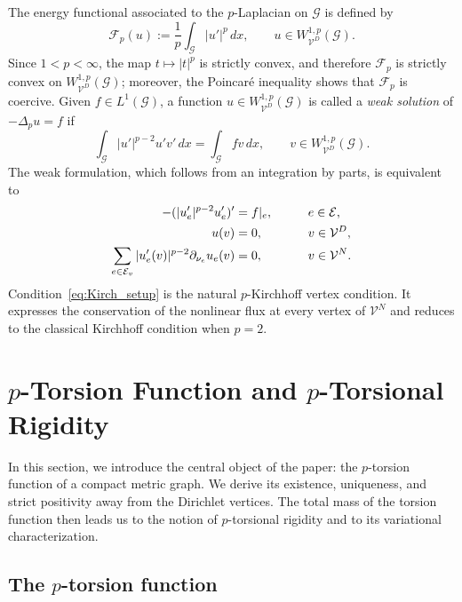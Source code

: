 \documentclass[12pt,a4paper]{article}
\numberwithin{equation}{section}
\newcommand{\WpD}{W^{1,p}_{\mathcal{V}^D}(\mathcal G)}
\begin{document}
The energy functional associated to the $p$-Laplacian on $\mathcal G$ is defined by
\begin{equation}\label{eq:Fp}
	\mathcal F_p(u)
	:=
	\frac1p\int_{\mathcal G}|u'|^p\,dx,
	\qquad
	u\in\WpD.
\end{equation}
Since $1<p<\infty$, the map $t\mapsto |t|^p$ is strictly convex, and therefore
$\mathcal F_p$ is strictly convex on $\WpD$; moreover, the Poincar\'e
inequality shows that $\mathcal F_p$ is coercive. Given
$f\in L^1(\mathcal G)$, a function
$u\in\WpD$ is called a \emph{weak solution} of
\(
-\Delta_pu=f
\)
if
\begin{equation}\label{eq:plap_duality}
	\int_{\mathcal G}|u'|^{p-2}u'v'\,dx
	=
	\int_{\mathcal G}fv\,dx,
	\qquad
	v\in\WpD.
\end{equation}
The weak formulation, which follows from an integration by parts, is equivalent to
\begin{alignat}{2}
	-(|u_e'|^{p-2}u_e')'
	&=f|_e,
	&&\qquad e\in \mathcal{E},\notag\\
	u(v)&=0,
	&&\qquad v\in \mathcal{V}^D,\notag\\
	\sum_{e\in \mathcal{E}_v}|u_e'(v)|^{p-2}\partial_{\nu_e}u_e(v)
	&=0,
	&&\qquad v\in \mathcal{V}^N.
	\label{eq:Kirch_setup}
\end{alignat}
Condition~\eqref{eq:Kirch_setup} is the natural $p$-Kirchhoff vertex
condition. It expresses the conservation of the nonlinear flux at every
vertex of $\mathcal V^N$ and reduces to the classical Kirchhoff condition
when $p=2$.
\section{\texorpdfstring{$p$}{p}-Torsion Function
	and \texorpdfstring{$p$}{p}-Torsional Rigidity}
\label{sec:torsion}

In this section, we introduce the central object of the paper: the
$p$-torsion function of a compact metric graph. We derive its
existence, uniqueness, and strict positivity away from the Dirichlet
vertices. The total mass of the torsion
function then leads us to the notion of $p$-torsional rigidity and to
its variational characterization.
\subsection{The \texorpdfstring{$p$}{p}-torsion function}
\end{document}
